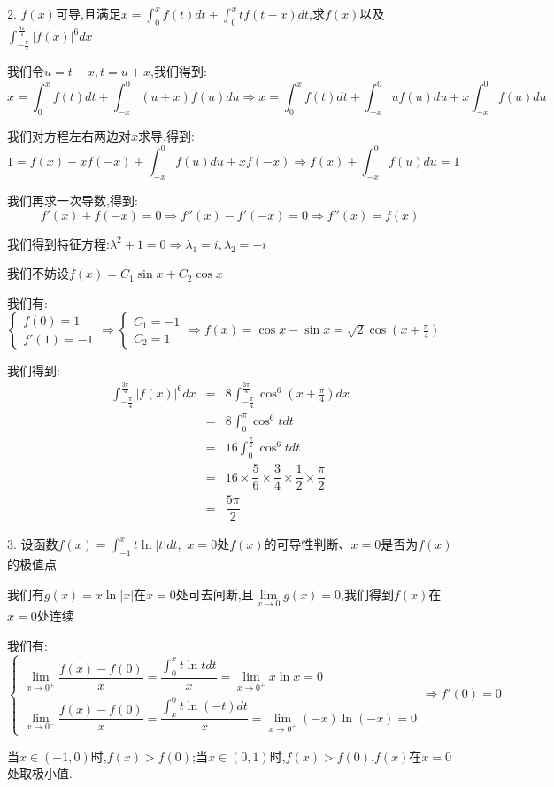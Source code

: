 2. $f(x)$可导,且满足$x=\int_{0}^{x}f(t)dt+\int_{0}^{x}tf(t-x)dt$,求$f(x)$以及$\int_{-\frac{\pi}{4}}^{\frac{3\pi}{4}}|f(x)|^6dx$
\begin{solution}

	我们令$u=t-x,t=u+x$,我们得到:
	$$x=\int_{0}^{x}f(t)dt+\int_{-x}^{0}(u+x)f(u)du\Rightarrow x=\int_{0}^{x}f(t)dt+\int_{-x}^{0}uf(u)du+x\int_{-x}^{0}f(u)du$$
	
	我们对方程左右两边对$x$求导,得到:
	$$1=f(x)-xf(-x)+\int_{-x}^{0}f(u)du+xf(-x)\Rightarrow f(x)+\int_{-x}^{0}f(u)du=1$$
	
	我们再求一次导数,得到:  
	$$f'(x)+f(-x)=0\Rightarrow f''(x)-f'(-x)=0\Rightarrow f''(x)=f(x)$$
	
	我们得到特征方程:$\lambda^2+1=0\Rightarrow \lambda_{1}=i,\lambda_{2}=-i$
	
	我们不妨设$f(x)=C_{1}\sin x+C_{2}\cos x$
	
	我们有:$\left\lbrace
	\begin{array}{l}
		f(0)=1\\
		f'(1)=-1
	\end{array}
	\right. \Rightarrow \left\lbrace
	\begin{array}{l}
		C_{1}=-1\\
		C_{2}=1
	\end{array}
	\right. \Rightarrow f(x)=\cos x-\sin x=\sqrt{2}\cos(x+\frac{\pi}{4})$
	
	我们得到:
	\begin{eqnarray*}
		\int_{-\frac{\pi}{4}}^{\frac{3\pi}{4}}|f(x)|^6dx&=&8\int_{-\frac{\pi}{4}}^{\frac{3\pi}{4}}\cos^6(x+\frac{\pi}{4})dx\\
		&=&8\int_{0}^{\pi}\cos^6 tdt\\
		&=&16\int_{0}^{\frac{\pi}{2}}\cos^6 tdt\\
		&=&16\times\dfrac{5}{6}\times\dfrac{3}{4}\times\dfrac{1}{2}\times\dfrac{\pi}{2}\\
		&=&\dfrac{5\pi}{2}
	\end{eqnarray*}
\end{solution}

3. 设函数$f(x)=\int_{-1}^{x}t\ln|t|dt$,\ $x=0$处$f(x)$的可导性判断、$x=0$是否为$f(x)$的极值点
\begin{solution}

	我们有$g(x)=x\ln|x|$在$x=0$处可去间断,且$\lim\limits_{x\rightarrow 0}g(x)=0$,我们得到$f(x)$在$x=0$处连续
	
	我们有:
	$$\left\lbrace
	\begin{array}{l}
		\lim\limits_{x\rightarrow 0^{+}}\dfrac{f(x)-f(0)}{x}=\dfrac{\int_{0}^{x}t\ln tdt}{x}=\lim\limits_{x\rightarrow 0^{+}}x\ln x=0\\
		\lim\limits_{x\rightarrow 0^{-}}\dfrac{f(x)-f(0)}{x}=\dfrac{\int_{x}^{0}t\ln(-t)dt}{x}=\lim\limits_{x\rightarrow 0^{+}}(-x)\ln(-x)=0
	\end{array}
	\right. \Rightarrow f'(0)=0$$
	
	当$x\in(-1,0)$时,$f(x)>f(0)$;当$x\in(0,1)$时,$f(x)>f(0)$,$f(x)$在$x=0$处取极小值.
\end{solution}

